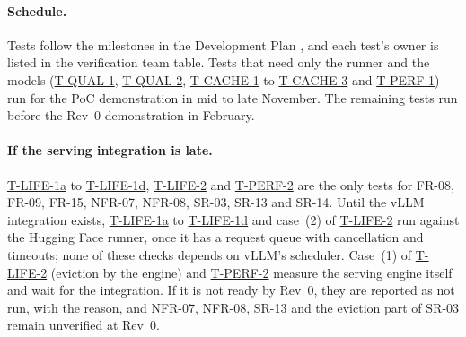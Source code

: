 \documentclass[12pt, titlepage]{article}
\newcommand{\tref}[1]{\hyperref[test:#1]{#1}}
\begin{document}
\paragraph{Schedule.}\label{sec:schedule}
Tests follow the milestones in the Development Plan \citep{TandemDevPlan},
and each test's owner is listed in the verification team table. Tests that
need only the runner and the models (\tref{T-QUAL-1}, \tref{T-QUAL-2},
\tref{T-CACHE-1} to \tref{T-CACHE-3} and \tref{T-PERF-1}) run for the PoC
demonstration in mid to late November. The remaining tests run before the
Rev~0 demonstration in February.

\paragraph{If the serving integration is late.}
\tref{T-LIFE-1a} to \tref{T-LIFE-1d}, \tref{T-LIFE-2} and \tref{T-PERF-2} are the only tests
for FR-08, FR-09, FR-15, NFR-07, NFR-08, SR-03, SR-13 and SR-14. Until the
vLLM integration exists, \tref{T-LIFE-1a} to \tref{T-LIFE-1d} and case~(2) of \tref{T-LIFE-2}
run against the Hugging Face runner, once it has a request queue with
cancellation and timeouts; none of these checks depends on vLLM's
scheduler. Case~(1) of \tref{T-LIFE-2} (eviction by the engine) and
\tref{T-PERF-2} measure the serving engine itself and wait for the
integration. If it is not ready by Rev~0, they are reported as not run,
with the reason, and NFR-07, NFR-08, SR-13 and the eviction part of SR-03
remain unverified at Rev~0.
\end{document}
